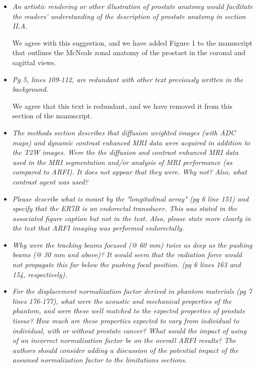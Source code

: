 \documentclass[10pt]{article}
\begin{document}
\begin{itemize}

    \item \textit{An artistic rendering or other illustration of prostate
            anatomy would facilitate the readers' understanding of the
            description of prostate anatomy in section II.A.}

    We agree with this suggestion, and we have added Figure 1 to the manuscript
    that outlines the McNeals zonal anatomy of the prostaet in the coronal and
    sagittal views.

    \item \textit{Pg 5, lines 109-112, are redundant with other text previously
            written in the background.}

    We agree that this text is redundant, and we have removed it from this
    section of the manuscript.

    \item \textit{The methods section describes that diffusion weighted images
            (with ADC maps) and dynamic contrast enhanced MRI data were
            acquired in addition to the T2W images.  Were the the diffusion and
            contrast enhanced MRI data used in the MRI segmentation and/or
            analysis of MRI performance (as compared to ARFI).  It does not
            appear that they were.  Why not?  Also, what contrast agent was
            used?}

    \item \textit{Please describe what is meant by the "longitudinal array" (pg
            6 line 151) and specify that the ER7B is an endorectal transducer.
            This was stated in the associated figure caption but not in the
            text.  Also, please state more clearly in the text that ARFI
            imaging was performed endorectally.}

    \item \textit{Why were the tracking beams focused (@ 60 mm) twice as deep
            as the pushing beams (@ 30 mm and above)?  It would seem that the
            radiation force would not propagate this far below the pushing
            focal position. (pg 6 lines 163 and 154, respectively).}

    \item \textit{For the displacement normalization factor derived in phantom
            materials (pg 7 lines 176-177), what were the acoustic and
            mechanical properties of the phantom, and were these well matched
            to the expected properties of prostate tissue?  How much are these
            properties expected to vary from individual to individual, with or
            without prostate cancer?  What would the impact of using of an
            incorrect normalization factor be on the overall ARFI results?  The
            authors should consider adding a discussion of the potential impact
            of the assumed normalization factor to the limitations sections.}


\end{itemize}
\end{document}
